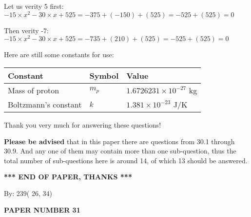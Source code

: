 \documentclass[12pt]{article}
\begin{document}
Let us verity  %
5 first:
$  %
-15 \times x^2  %
-30
                 \times x    %
+  %
525
  = %
-375+( %
-150)+( %
525)
  = %
-525+( %
525)
  = %
0
$
 
Then verity  %
-7:
$  %
-15 \times x^2  %
-30
                 \times x    %
+  %
525
  = %
-735+( %
210)+( %
525)
  = %
-525+( %
525)
  = %
0
$
 
 
 
   
   
 \vspace{0.2in}
Here are still some constants for use:
 
 
\noindent\begin{tabular}{|l|l|l|}
\hline
Constant & Symbol & Value \\
\hline
 
Mass of proton &
$m_p$ &
 $ 1.6726231 \times 10^{-27} $
kg \\
\hline
 
Boltzmann's constant &
$k$ &
 $ 1.381 \times 10^{-23} $
J/K \\
\hline
 
\end{tabular}
 
Thank you very much for answering these questions!
 
{\textbf{\large{Please be advised}}} that in this paper there are questions from
30.1 through
30.9.
And any one of them may contain more than one sub-question, thus the total number
of sub-questions here is around 14, of which
13 should be answered.
 
   
   
   
   
\vspace{1.0in} 
{\textbf{\large{ *** END OF PAPER, THANKS *** }}} 
   
   
\hspace{1.0in} By: 
         239(         26,          34)
   
   
   
   
\newpage 
\setcounter{page}{ 
    31001 } 
   
   
   
   
 {\textbf{ \Large{ PAPER NUMBER          31 }}}
   
   
\vspace{0.2in}
   
   
   
\end{document}
